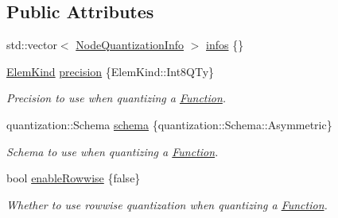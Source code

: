 \subsection*{Public Attributes}
\begin{DoxyCompactItemize}
\item 
std\+::vector$<$ \hyperlink{structglow_1_1_node_quantization_info}{Node\+Quantization\+Info} $>$ \hyperlink{structglow_1_1quantization_1_1_quantization_configuration_aef3b75a36b8e5d3ce182f830916a1523}{infos} \{\}
\item 
\mbox{\label{structglow_1_1quantization_1_1_quantization_configuration_a52c5fc8f37b6bbd733e9c566af71ec68}} 
\hyperlink{namespaceglow_ab92e14a94329daf4083db670e95fbcdf}{Elem\+Kind} \hyperlink{structglow_1_1quantization_1_1_quantization_configuration_a52c5fc8f37b6bbd733e9c566af71ec68}{precision} \{Elem\+Kind\+::\+Int8\+Q\+Ty\}
\begin{DoxyCompactList}\small\item\em Precision to use when quantizing a \hyperlink{classglow_1_1_function}{Function}. \end{DoxyCompactList}\item 
\mbox{\label{structglow_1_1quantization_1_1_quantization_configuration_a20042b241af027985e29d9e5563cd467}} 
quantization\+::\+Schema \hyperlink{structglow_1_1quantization_1_1_quantization_configuration_a20042b241af027985e29d9e5563cd467}{schema} \{quantization\+::\+Schema\+::\+Asymmetric\}
\begin{DoxyCompactList}\small\item\em Schema to use when quantizing a \hyperlink{classglow_1_1_function}{Function}. \end{DoxyCompactList}\item 
\mbox{\label{structglow_1_1quantization_1_1_quantization_configuration_af9e5e01ed93e69257bcfe2c0aba90e75}} 
bool \hyperlink{structglow_1_1quantization_1_1_quantization_configuration_af9e5e01ed93e69257bcfe2c0aba90e75}{enable\+Rowwise} \{false\}
\begin{DoxyCompactList}\small\item\em Whether to use rowwise quantization when quantizing a \hyperlink{classglow_1_1_function}{Function}. \end{DoxyCompactList}\item 

\end{DoxyCompactItemize}
